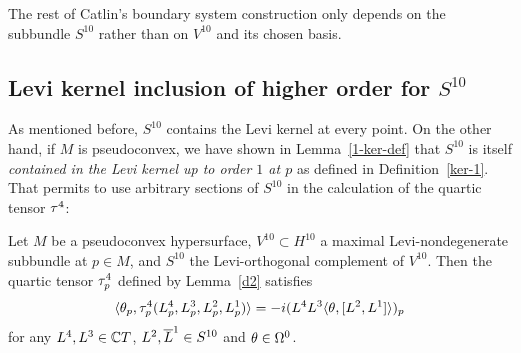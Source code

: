 \documentclass[12pt]{amsart}
\begin{document}
The rest of Catlin's boundary system construction 
only depends on the subbundle $S^{10}$ 
rather than on $V^{10}$ and its chosen basis.



\subsection{Levi kernel inclusion of higher order for $S^{10}$}
As mentioned before, $S^{10}$ contains the Levi kernel at every point.
On the other hand, if $M$ is pseudoconvex,
we have shown in Lemma~\ref{1-ker-def} 
that $S^{10}$ is itself 
{\em contained in the Levi kernel up to order $1$ at $p$}
as defined in Definition~\ref{ker-1}.
That permits to use arbitrary sections of $S^{10}$
in the calculation of the quartic tensor $\tau^4$:

\bc{}
Let $M$ be a pseudoconvex hypersurface,
$V^{10}\subset H^{10}$
a maximal Levi-nondegenerate subbundle at $p\in M$,
and $S^{10}$ the Levi-orthogonal complement of $V^{10}$.
Then the quartic tensor $\tau^4_p$ defined by Lemma~\ref{d2}
satisfies 
$$
	\langle \theta_p, \tau^4_p(L^4_p, L^3_p, L^2_p, L^1_p)\rangle 
	= -i(L^4 L^3 \langle \theta, [L^2, L^1]\rangle)_p
$$
for any $L^4, L^3 \in {\mathbb{C}} T$, $L^2, \overline{L}^1\in S^{10}$ and $\theta\in \Omega^0$.
\ec






%
%
\end{document}
